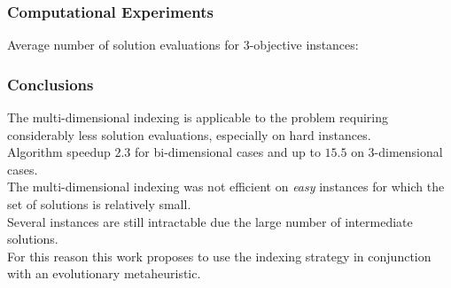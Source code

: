 %
\begin{frame}
\frametitle{Computational Experiments}
Average number of solution evaluations for 3-objective instances:
\begin{figure}
  
\end{figure}
\end{frame}


%
\begin{frame}
\frametitle{Conclusions}
The multi-dimensional indexing is applicable to the problem requiring
considerably less solution evaluations, especially on hard instances.
\\ \medskip \pause
Algorithm speedup $2.3$ for bi-dimensional
cases and up to $15.5$ on 3-dimensional cases.
\\ \medskip \pause
The multi-dimensional indexing was not efficient on \textit{easy} instances
for which the set of solutions is relatively small.
\\ \medskip \pause
Several instances are still intractable due
the large number of intermediate solutions.
\\ \medskip \pause
For this reason this work proposes to use the indexing strategy
in conjunction with an evolutionary metaheuristic.
\end{frame}
